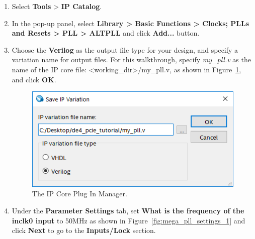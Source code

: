 \documentclass[11pt, twoside, pdftex]{article}
\begin{document}
\begin{enumerate}
	\item Select {\bf Tools} > {\bf IP Catalog}. %
	\item In the pop-up panel, select {\bf Library > Basic Functions > Clocks; PLLs and Resets > PLL > ALTPLL} and click {\bf Add...} button.
	\item Choose the {\bf Verilog} as the output file type for your design, and specify a variation name for output files. For this walkthrough, specify {\it my\_pll.v} as the name of the IP core file: <working\_dir>/my\_pll.v, as shown in Figure~\ref{fig:megawizard_pll}, and click {\bf OK}.

\begin{figure}[H]
	\centering
	  \includegraphics[scale=0.65]{figures/megawizard_pll.png}
	\caption{The IP Core Plug In Manager.} 
	\label{fig:megawizard_pll}
\end{figure}

	\item Under the {\bf Parameter Settings} tab, set {\bf What is the frequency of the inclk0 input} to 50MHz as shown in Figure~\ref{fig:mega_pll_settings_1} and click {\bf Next} to go to the {\bf Inputs/Lock} section.
	

\end{enumerate}
\end{document}
